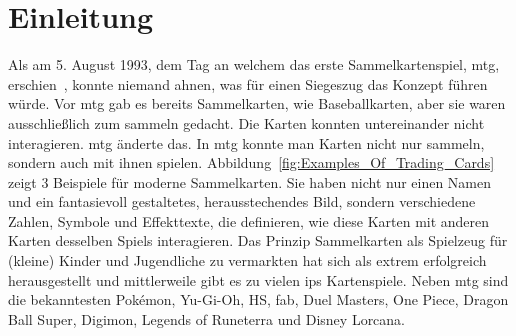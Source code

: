 \documentclass[fontsize=11, a4aper]{scrartcl}
\begin{document}
\section{Einleitung} \label{sec:Einleitung}

Als am 5. August 1993, dem Tag an welchem das erste Sammelkartenspiel, \ac{mtg}, erschien~\cite{Magic_:_the_Gathering_Release_Date}, konnte niemand ahnen, was für einen Siegeszug das Konzept führen würde. Vor \ac{mtg} gab es bereits Sammelkarten, wie Baseballkarten, aber sie waren ausschließlich zum sammeln gedacht. Die Karten konnten untereinander nicht interagieren. \ac{mtg} änderte das. In \ac{mtg} konnte man Karten nicht nur sammeln, sondern auch mit ihnen spielen. Abbildung~\ref{fig:Examples_Of_Trading_Cards} zeigt 3 Beispiele für moderne Sammelkarten. Sie haben nicht nur einen Namen und ein fantasievoll gestaltetes, herausstechendes Bild, sondern verschiedene Zahlen, Symbole und Effekttexte, die definieren, wie diese Karten mit anderen Karten desselben Spiels interagieren. Das Prinzip Sammelkarten als Spielzeug für (kleine) Kinder und Jugendliche zu vermarkten hat sich als extrem erfolgreich herausgestellt und mittlerweile gibt es zu vielen \acp{ip} Kartenspiele. Neben \ac{mtg} sind die bekanntesten Pok\'emon, Yu-Gi-Oh, \ac{HS}, \ac{fab}, Duel Masters, One Piece, Dragon Ball Super, Digimon, Legends of Runeterra und Disney Lorcana.\hfill\newline

\end{document}
